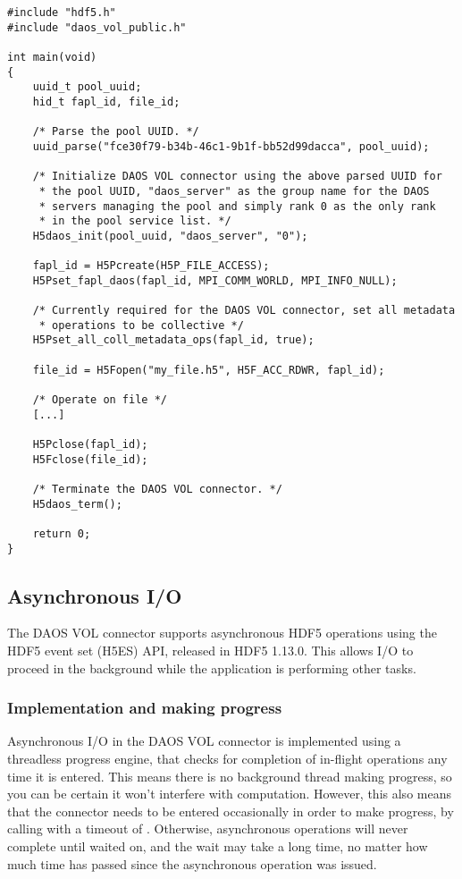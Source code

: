 \documentclass[../users_guide.tex]{subfiles}
\begin{document}
\begin{verbatim}
#include "hdf5.h"
#include "daos_vol_public.h"

int main(void)
{
    uuid_t pool_uuid;
    hid_t fapl_id, file_id;

    /* Parse the pool UUID. */
    uuid_parse("fce30f79-b34b-46c1-9b1f-bb52d99dacca", pool_uuid);

    /* Initialize DAOS VOL connector using the above parsed UUID for
     * the pool UUID, "daos_server" as the group name for the DAOS
     * servers managing the pool and simply rank 0 as the only rank
     * in the pool service list. */
    H5daos_init(pool_uuid, "daos_server", "0");

    fapl_id = H5Pcreate(H5P_FILE_ACCESS);
    H5Pset_fapl_daos(fapl_id, MPI_COMM_WORLD, MPI_INFO_NULL);

    /* Currently required for the DAOS VOL connector, set all metadata
     * operations to be collective */
    H5Pset_all_coll_metadata_ops(fapl_id, true); 

    file_id = H5Fopen("my_file.h5", H5F_ACC_RDWR, fapl_id);

    /* Operate on file */
    [...]

    H5Pclose(fapl_id);
    H5Fclose(file_id);

    /* Terminate the DAOS VOL connector. */
    H5daos_term();

    return 0;
}
\end{verbatim}

\subsection{Asynchronous I/O}

The DAOS VOL connector supports asynchronous HDF5 operations using the HDF5
event set (H5ES) API, released in HDF5 1.13.0. This allows I/O to proceed in the
background while the application is performing other tasks.

\subsubsection{Implementation and making progress}

Asynchronous I/O in the DAOS VOL connector is implemented using a threadless
progress engine, that checks for completion of in-flight operations any time it
is entered. This means there is no background thread making progress, so you can
be certain it won't interfere with computation. However, this also means that
the connector needs to be entered occasionally in order to make progress, by
calling  with a timeout of . Otherwise,
asynchronous operations will never complete until waited on, and the wait may
take a long time, no matter how much time has passed since the asynchronous
operation was issued.
\end{document}
